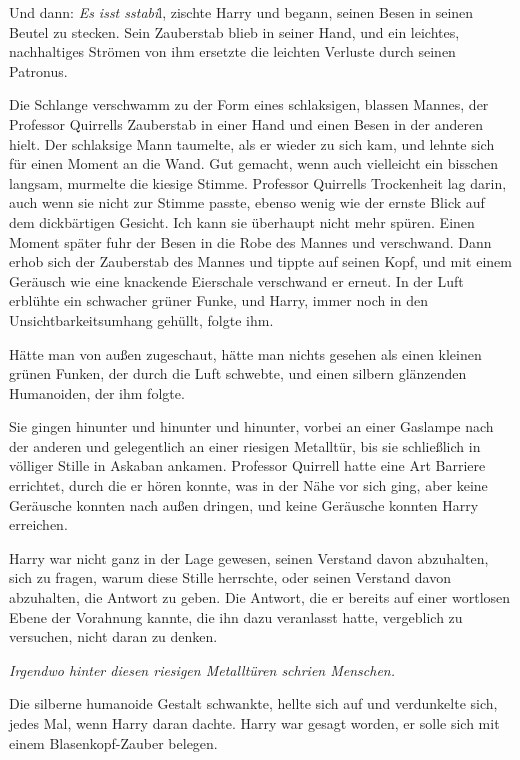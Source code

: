 Und dann: \glqq{}\emph{Es isst sstabi}l\grqq{}, zischte Harry und begann, seinen
Besen in seinen Beutel zu stecken. Sein Zauberstab blieb in seiner Hand, und ein
leichtes, nachhaltiges Strömen von ihm ersetzte die leichten Verluste durch
seinen Patronus.

Die Schlange verschwamm zu der Form eines schlaksigen, blassen Mannes, der
Professor Quirrells Zauberstab in einer Hand und einen Besen in der anderen
hielt. Der schlaksige Mann taumelte, als er wieder zu sich kam, und lehnte sich
für einen Moment an die Wand. \glqq{}Gut gemacht, wenn auch vielleicht ein
bisschen langsam\grqq{}, murmelte die kiesige Stimme. Professor Quirrells
Trockenheit lag darin, auch wenn sie nicht zur Stimme passte, ebenso wenig wie
der ernste Blick auf dem dickbärtigen Gesicht. \glqq{}Ich kann sie überhaupt
nicht mehr spüren.\grqq{} Einen Moment später fuhr der Besen in die Robe des Mannes
und verschwand. Dann erhob sich der Zauberstab des Mannes und tippte auf seinen
Kopf, und mit einem Geräusch wie eine knackende Eierschale verschwand er erneut.
In der Luft erblühte ein schwacher grüner Funke, und Harry, immer noch in den
Unsichtbarkeitsumhang gehüllt, folgte ihm.

Hätte man von außen zugeschaut, hätte man nichts gesehen als einen kleinen
grünen Funken, der durch die Luft schwebte, und einen silbern glänzenden
Humanoiden, der ihm folgte.

Sie gingen hinunter und hinunter und hinunter, vorbei an einer Gaslampe nach der
anderen und gelegentlich an einer riesigen Metalltür, bis sie schließlich in
völliger Stille in Askaban ankamen. Professor Quirrell hatte eine Art Barriere
errichtet, durch die er hören konnte, was in der Nähe vor sich ging, aber keine
Geräusche konnten nach außen dringen, und keine Geräusche konnten Harry
erreichen.

Harry war nicht ganz in der Lage gewesen, seinen Verstand davon abzuhalten, sich
zu fragen, warum diese Stille herrschte, oder seinen Verstand davon abzuhalten,
die Antwort zu geben. Die Antwort, die er bereits auf einer wortlosen Ebene der
Vorahnung kannte, die ihn dazu veranlasst hatte, vergeblich zu versuchen, nicht
daran zu denken.

\emph{Irgendwo hinter diesen riesigen Metalltüren schrien Menschen.}

Die silberne humanoide Gestalt schwankte, hellte sich auf und verdunkelte sich,
jedes Mal, wenn Harry daran dachte. Harry war gesagt worden, er solle sich mit
einem Blasenkopf-Zauber belegen.

